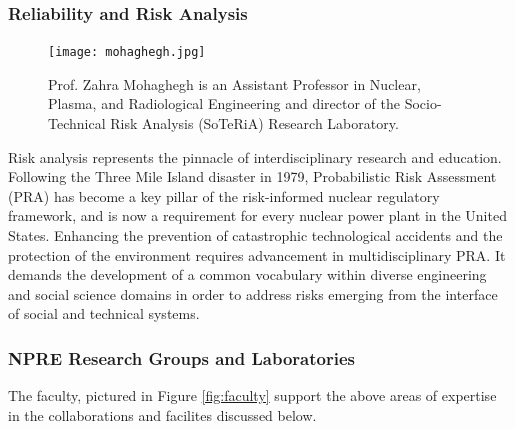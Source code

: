 \subsubsection{Reliability and Risk Analysis}
\begin{figure}
  \begin{center}
  \vspace{-\baselineskip}
    \texttt{[image: mohaghegh.jpg]}
    \caption{Prof. Zahra Mohaghegh is an Assistant Professor in Nuclear, 
          Plasma, and Radiological Engineering and director of the 
          Socio-Technical Risk Analysis (SoTeRiA) Research Laboratory.}
  \end{center}
\end{figure}
Risk analysis represents the pinnacle of interdisciplinary research and education. Following the Three Mile Island disaster in 1979, Probabilistic Risk Assessment (PRA) has become a key pillar of the risk-informed nuclear regulatory framework, and is now a requirement for every nuclear power plant in the United States. Enhancing the prevention of catastrophic technological accidents and the protection of the environment requires advancement in multidisciplinary PRA. It demands the development of a common vocabulary within diverse engineering and social science domains in order to address risks emerging from the interface of social and technical systems.
\subsubsection{NPRE Research Groups and Laboratories}
The faculty, pictured in Figure \ref{fig:faculty} support the above areas of 
expertise in the collaborations and facilites discussed below.

